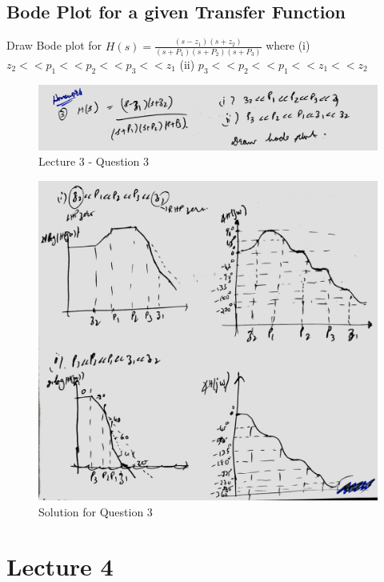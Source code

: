 \documentclass[a4paper]{article}
\begin{document}
\subsection{Bode Plot for a given Transfer Function}
Draw Bode plot for $H(s) = \frac{(s - z_1)(s+z_2)}{(s+P_1)(s+P_2)(s+P_3)}$ where (i) $z_2 << p_1 << p_2 << p_3 << z_1$ (ii) $p_3 << p_2 << p_1 << z_1 << z_2$
\begin{figure}
    \centering
    \includegraphics[width=0.8\linewidth]{images/Lec_3_Q_3.jpeg}
    \caption{Lecture 3 - Question 3}
\end{figure}
\begin{figure}
    \centering
    \includegraphics[width=1\linewidth]{images/Lec_3_Q3_Soln.jpeg}
    \caption{Solution for Question 3}
\end{figure}
\section{Lecture 4}
\end{document}
